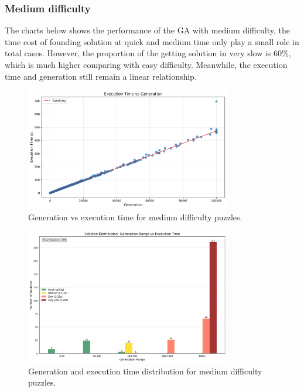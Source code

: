 \subsubsection{Medium difficulty}

The charts below shows the performance of the GA with medium difficulty, the time cost of founding solution at quick and medium time only play a small role in total cases.
However, the proportion of the getting solution in very slow is $60\%$, which is much higher comparing with easy difficulty.
Meanwhile, the execution time and generation still remain a linear relationship.

\begin{figure}[H]
\centering
\includegraphics[width=0.8\textwidth]{resources/generation_vs_execution_time_medium.png}
\caption{Generation vs execution time for medium difficulty puzzles.}
\label{fig:generation_vs_execution_time_medium}
\end{figure}

\begin{figure}[H]
\centering
\includegraphics[width=0.8\textwidth]{resources/generation_execution_time_bars_medium.png}
\caption{Generation and execution time distribution for medium difficulty puzzles.}
\label{fig:generation_execution_time_bars_medium}
\end{figure}

